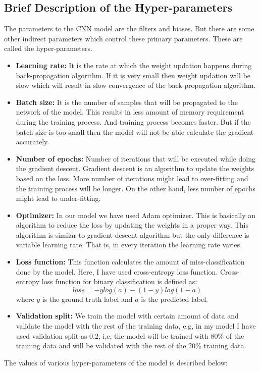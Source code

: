 \subsection{Brief Description of the Hyper-parameters}
The parameters to the CNN model are the filters and biases. But there are some other indirect parameters which control these primary parameters. These are called the hyper-parameters. 
\begin{itemize}
    \item \textbf{Learning rate: }It is the rate at which the weight updation happens during back-propagation algorithm. If it is very small then weight updation will be slow which will result in slow convergence of the back-propagation algorithm.
    \item \textbf{Batch size: }It is the number of samples that will be propagated to the network of the model. This results in less amount of memory requirement during the training process. And training process becomes faster. But if the batch size is too small then the model will not be able calculate the gradient accurately.
    \item \textbf{Number of epochs: }Number of iterations that will be executed while doing the gradient descent. Gradient descent is an algorithm to update the weights based on the loss. More number of iterations might lead to over-fitting and the training process will be longer. On the other hand, less number of epochs might lead to under-fitting.
    \item \textbf{Optimizer: }In our model we have used Adam optimizer. This is basically an algorithm to reduce the loss by updating the weights in a proper way. This algorithm is similar to gradient descent algorithm but the only difference is variable learning rate. That is, in every iteration the learning rate varies.
    \item \textbf{Loss function: }This function calculates the amount of miss-classification done by the model. Here, I have used cross-entropy loss function. Cross-entropy loss function for binary classification is defined as: 
    $$loss=-ylog(a)-(1-y)log(1-a)$$ where $y$ is the ground truth label and $a$ is the predicted label. 
    \item \textbf{Validation split: }We train the model with certain amount of data and validate the model with the rest of the training data, e.g, in my model I have used validation split as 0.2, i,e, the model will be trained with 80\% of the training data and will be validated with the rest of the 20\% training data.
\end{itemize}
The values of various hyper-parameters of the model is described below: \\


